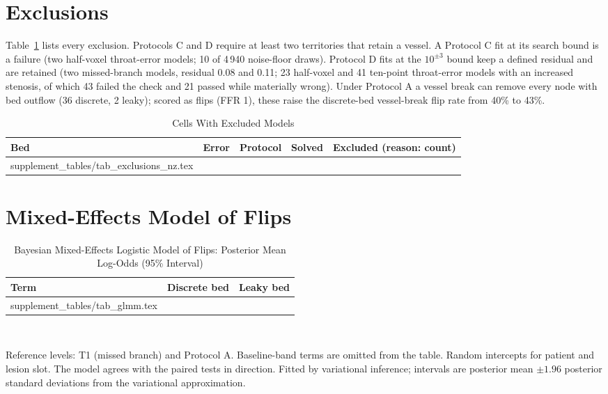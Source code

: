 \documentclass[journal,twoside,web,onecolumn]{ieeecolor}
\begin{document}
\FloatBarrier
{}
\section{Exclusions}
Table~\ref{tab:excl} lists every exclusion. Protocols C and D require at least two territories that retain a
vessel. A Protocol C fit at its search bound is a failure (two half-voxel throat-error models; 10 of 4\,940
noise-floor draws). Protocol D fits at the $10^{\pm 3}$ bound keep a defined residual and are retained (two
missed-branch models, residual 0.08 and 0.11; 23 half-voxel and 41 ten-point throat-error models with an increased stenosis, of which 43 failed the check and 21
passed while materially wrong).
Under Protocol A a vessel break can remove every node with bed outflow (36 discrete, 2 leaky); scored as flips (FFR 1),
these raise the discrete-bed vessel-break flip rate from 40\% to 43\%.
\begin{table}[!ht]
\caption{Cells With Excluded Models}\label{tab:excl}
\centering\footnotesize
\begin{tabular}{@{}lllrl@{}}
\toprule
Bed & Error & Protocol & Solved & Excluded (reason: count)\\
\midrule
{} supplement_tables/tab_exclusions_nz.tex 
\bottomrule
\end{tabular}
\end{table}

\FloatBarrier
{}
\section{Mixed-Effects Model of Flips}
\begin{table}[!ht]
\caption{Bayesian Mixed-Effects Logistic Model of Flips: Posterior Mean Log-Odds (95\% Interval)}\label{tab:glmm}
\centering\footnotesize
\begin{tabular}{@{}lcc@{}}
\toprule
Term & Discrete bed & Leaky bed\\
\midrule
{} supplement_tables/tab_glmm.tex 
\bottomrule
\end{tabular}
\\[3pt]
\parbox{0.85\textwidth}{\footnotesize Reference levels: T1 (missed branch) and Protocol A. Baseline-band terms are
omitted from the table. Random intercepts for patient and lesion slot. The model agrees with the paired tests in direction. Fitted by variational inference; intervals are
posterior mean $\pm 1.96$ posterior standard deviations from the variational approximation.}
\end{table}
\end{document}
